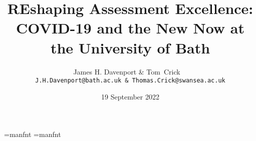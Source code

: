 \font\manual=manfnt
\def\dbend{{\manual\char127}}
\def\warn#1{\begin{itemize}\item[\dbend]#1\end{itemize}}
\def\red#1{{\color{red}#1}}
\def\redtt{\color{red}\tt}
\def\bluett{\color{blue}\tt}
\font\manual=manfnt
\def\dbend{{\manual\char127}}
\def\eqq{{\buildrel?\over=}}
\def\I{{\cal I}}
\def\Z{{\bf Z}}
\def\Q{{\bf Q}}
\def\C{{\bf C}}
\def\N{{\bf N}}
\def\R{{\bf R}}
\def\CL{\mathop{\rm CL}}
\def\IDA{{}_{\rm DA}\int}
\def\DDA{D_{\rm DA}}
\def\arctanDA{\arctan_{\rm DA}}
\def\logDA{\log_{\rm DA}}
\def\cDA{constant${}_{\rm DA}$}
\def\fracDDA#1#2{\frac{{\rm d}#1}{{\rm d}_{\rm DA}#2}}
\def\Ied{{}_{\epsilon\delta}\int}
\def\Ded{D_{\epsilon\delta}}
\def\arctaned{\arctan_{\epsilon\delta}}
\def\loged{\log_{\epsilon\delta}}
\def\fracDed#1#2{\frac{{\rm d}#1}{{\rm d}_{\epsilon\delta}#2}}

\documentclass[notes=hide]{beamer}   %
\usepackage[final]{pdfpages}




\usepackage{verbatim}
\usepackage{url}
\usepackage{color}

\title[Reshaping \dots{} Bath]{REshaping Assessment Excellence: COVID-19 and the New Now at the University of Bath}
\author{James H. Davenport \& \hbox{Tom Crick\ \qquad\ \qquad}\\
\small\tt J.H.Davenport@bath.ac.uk \& Thomas.Crick@swansea.ac.uk}
\date{19 September 2022}%
\expandafter\def\expandafter\insertshorttitle\expandafter{%
  \insertshorttitle\hfill%
  \insertframenumber\,/\,\inserttotalframenumber}



